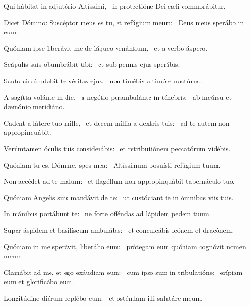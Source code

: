 \item Qui hábitat in adjutório Altíssimi,~\psstar{} in protectióne Dei cæli commorábitur.

\item Dicet Dómino: Suscéptor meus es tu, et refúgium meum:~\psstar{} Deus meus sperábo in eum.

\item Quóniam ipse liberávit me de láqueo venántium,~\psstar{} et a verbo áspero.

\item Scápulis suis obumbrábit tibi:~\psstar{} et sub pennis ejus sperábis.

\item Scuto circúmdabit te véritas ejus:~\psstar{} non timébis a timóre noctúrno.

\item A sagítta volánte in die,~\pscross{} a negótio perambulánte in ténebris:~\psstar{} ab incúrsu et dæmónio meridiáno.

\item Cadent a látere tuo mille,~\pscross{} et decem míllia a dextris tuis:~\psstar{} ad te autem non appropinquábit.

\item Verúmtamen óculis tuis considerábis:~\psstar{} et retributiónem peccatórum vidébis.

\item Quóniam tu es, Dómine, spes mea:~\psstar{} Altíssimum posuísti refúgium tuum.

\item Non accédet ad te malum:~\psstar{} et flagéllum non appropinquábit tabernáculo tuo.

\item Quóniam Angelis suis mandávit de te:~\psstar{} ut custódiant te in ómnibus viis tuis.

\item In mánibus portábunt te:~\psstar{} ne forte offéndas ad lápidem pedem tuum.

\item Super áspidem et basilíscum ambulábis:~\psstar{} et conculcábis leónem et dracónem.

\item Quóniam in me sperávit, liberábo eum:~\psstar{} prótegam eum quóniam cognóvit nomen meum.

\item Clamábit ad me, et ego exáudiam eum:~\pscross{} cum ipso sum in tribulatióne:~\psstar{} erípiam eum et glorificábo eum.

\item Longitúdine diérum replébo eum:~\psstar{} et osténdam illi salutáre meum.
